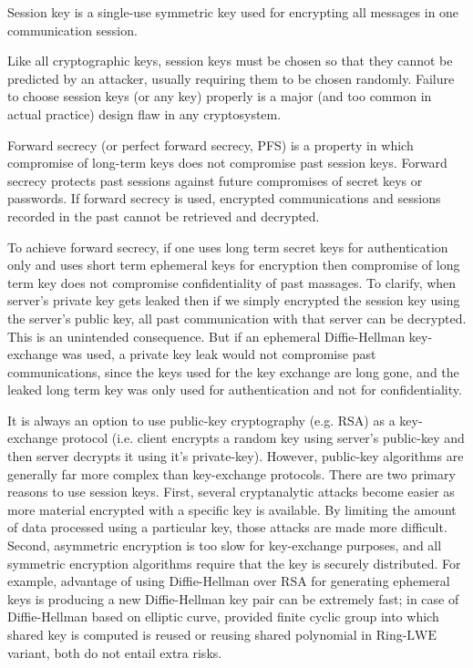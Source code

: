 \begin{definition}
\normalfont
Session key is a single-use symmetric key used for encrypting all messages in one communication session.
\end{definition}

Like all cryptographic keys, session keys must be chosen so that they cannot be predicted by an attacker, usually requiring them to be chosen randomly. Failure to choose session keys (or any key) properly is a major (and too common in actual practice) design flaw in any cryptosystem.

\begin{definition}
\normalfont
Forward secrecy (or perfect forward secrecy, PFS) is a property in which compromise of long-term keys does not compromise past session keys. Forward secrecy protects past sessions against future compromises of secret keys or passwords. If forward secrecy is used, encrypted communications and sessions recorded in the past cannot be retrieved and decrypted.
\end{definition}


To achieve forward secrecy, if one uses long term secret keys for authentication only and uses short term ephemeral keys for encryption then compromise of long term key does not compromise confidentiality of past massages. To clarify, when server's private key gets leaked then if we simply encrypted the session key using the server's public key, all past communication with that server can be decrypted. This is an unintended consequence. But if an ephemeral Diffie-Hellman key-exchange was used, a private key leak would not compromise past communications, since the keys used for the key exchange are long gone, and the leaked long term key was only used for authentication and not for confidentiality. 

It is always an option to use public-key cryptography (e.g. RSA) as a key-exchange protocol (i.e. client encrypts a random key using server's public-key and then server decrypts it using it's private-key). However, public-key algorithms are generally far more complex than key-exchange protocols. There are two primary reasons to use session keys. First, several cryptanalytic attacks become easier as more material encrypted with a specific key is available. By limiting the amount of data processed using a particular key, those attacks are made more difficult. Second, asymmetric encryption is too slow for key-exchange purposes, and all symmetric encryption algorithms require that the key is securely distributed. For example, advantage of using Diffie-Hellman over RSA for generating ephemeral keys is producing a new Diffie-Hellman key pair can be extremely fast; in case of Diffie-Hellman based on elliptic curve, provided finite cyclic group into which shared key is computed is reused or reusing shared polynomial in Ring-$\mathrm{LWE}$ variant, both do not entail extra risks.








